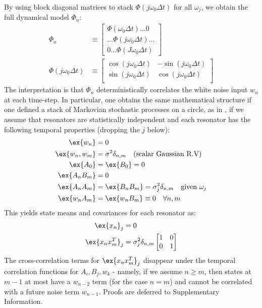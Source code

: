 By using block diagonal matrices to stack $\Phi(j \omega_0 \Delta t) $ for all $\omega_j$, we obtain the full dynamical model $\Phi_n$:
\begin{align}
\Phi_{n} & \equiv \begin{bmatrix} 
\Phi(\omega_0 \Delta t)\hdots 0  \\ 
 \hdots \Phi(j\omega_0 \Delta t) \hdots \\
0 \hdots \Phi(J \omega_0 \Delta t)  \end{bmatrix}\\ 
\Phi(j \omega_0 \Delta t) &\equiv \begin{bmatrix} \cos(j \omega_0 \Delta t) & -\sin(j \omega_0 \Delta t) \\ \sin(j \omega_0 \Delta t) & \cos(j \omega_0 \Delta t) \\ \end{bmatrix} \label{eqn:ap_approxSP:LKFFB_Phi} 
\end{align}
The interpretation is that $\Phi_n$ deterministically correlates the white noise input $w_n$ at each time-step. In particular, one obtains the same mathematical structure if one defined a stack of Markovian stochastic processes on a circle, as in \cite{karlin2012}, if we assume that resonators are statistically independent and each resonator has the following temporal properties (dropping the $j$ below):
\begin{align}
\ex{w_n} &= 0 \\
\ex{w_n,w_m} &= \sigma^2 \delta_{n,m} \quad \text{(scalar Gaussian R.V)} \\
\ex{A_0} &=\ex{B_0} = 0 \\
\ex{A_n B_m} &= 0 \\
\ex{A_n A_m} &= \ex{B_n B_m} = \sigma_j^2 \delta_{n,m} \quad \text{given $\omega_j$} \\
\ex{w_n A_m} &= \ex{w_n B_m} \equiv 0 \quad  \forall n, m 
\end{align}
This yields state means and covariances for each resonator as:
\begin{align}
\ex{x_n}_j &= 0  \\
\ex{x_n x_m^T}_j & = \sigma^2_j \delta_{n,m} \begin{bmatrix} 
1 & 0 \\ 
0 & 1  \\
\end{bmatrix} \label{eqn:cov_kf_nerm4}
\end{align}
The cross-correlation terms for $\ex{x_n x_m^T}_j$ disappear under the temporal correlation functions for $A_i, B_j, w_k$ - namely, if we assume $n \geq m$, then states at $m-1$ at most have a $w_{n-2}$ term (for the case $n=m$) and cannot be correlated with a future noise term $w_{n-1}$.  Proofs are deferred to Supplementary Information. 
